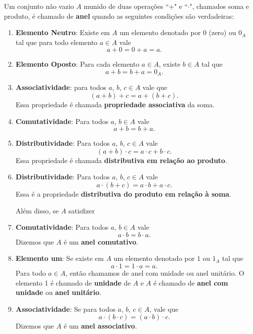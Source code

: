 \begin{definicao} Um conjunto n{\~a}o vazio $A$ munido de duas opera{\c c}{\~o}es ``+" e ``$\cdot$", chamados soma e produto, {\'e} chamado de \textbf{anel} quando as seguintes condi{\c c}{\~o}es s{\~a}o verdadeiras:
\begin{enumerate}
\item \textbf{Elemento Neutro}: Existe em $A$ um elemento denotado por 0 (zero) ou $0_{A}$ tal que para todo elemento $a\in A$ vale
\[
	a + 0 = 0 + a = a.
\]

\item \textbf{Elemento Oposto}: Para cada elemento $a\in A$, existe $b\in A$ tal que
\[
	a + b = b + a = 0_A.
\]

\item \textbf{Associatividade}: para todos $a$, $b$, $c\in A$ vale que
\[
	(a + b) + c = a + (b + c).
\]
Essa propriedade {\'e} chamada \textbf{propriedade associativa} da soma.

\item \textbf{Comutatividade}: Para todos $a$, $b \in A$ vale
\[
	a + b = b + a.
\]

\item \textbf{Distributividade}: Para todos $a$, $b$, $c \in A$ vale
\[
	(a + b)\cdot c = a\cdot c + b\cdot c.
\]
Essa propriedade {\'e} chamada \textbf{distributiva em rela{\c c}{\~a}o ao produto}.

\item \textbf{Distributividade}: Para todos $a$, $b$, $c\in A$ vale
\[
	a\cdot(b + c) = a\cdot b + a\cdot c.
\]
Essa {\'e} a propriedade \textbf{distributiva do produto em rela{\c c}{\~a}o {\`a} soma}.

Al{\'e}m disso, se $A$ satisfizer
\item \textbf{Comutatividade}: Para todos $a$, $b\in A$ vale
\[
	a\cdot b = b\cdot a.
\]
Dizemos que $A$ {\'e} um \textbf{anel comutativo}.

\item \textbf{Elemento um}: Se existe em $A$ um elemento denotado por $1$ ou $1_{A}$ tal que
\[
	a\cdot 1 = 1\cdot a = a.
\]
Para todo $a\in A$, ent{\~a}o chamamos de anel com unidade ou anel unit{\'a}rio. O elemento 1 {\'e} chamado de \textbf{unidade} de $A$ e $A$ \'e chamado de \textbf{anel com unidade} ou \textbf{anel unit\'ario}.

\item \textbf{Associatividade}: Se para todos $a$, $b$, $c\in A$, vale que
\[
	a\cdot (b\cdot c) = (a\cdot b)\cdot c.
\]
Dizemos que $A$ {\'e} um \textbf{anel associativo}.
\end{enumerate}
\end{definicao}

